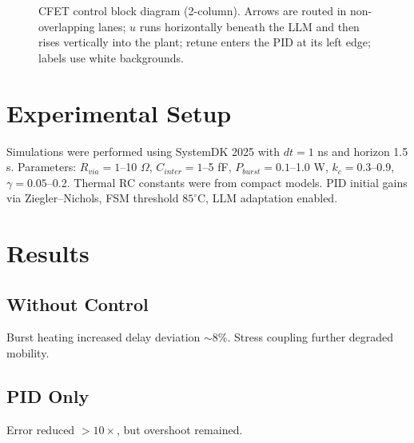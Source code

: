\documentclass[conference]{IEEEtran}
\begin{document}
\begin{figure}[!t]
{%
}
\caption{CFET control block diagram (2-column). Arrows are routed in non-overlapping lanes; $u$ runs horizontally beneath the LLM and then rises vertically into the plant; retune enters the PID at its left edge; labels use white backgrounds.}
\label{fig:model_tikz}
\end{figure}

\section{Experimental Setup}
Simulations were performed using SystemDK 2025 with $dt=1$ ns and horizon 1.5 s. Parameters:  
$R_{via}=1$--10 $\Omega$, $C_{inter}=1$--5 fF, $P_{burst}=0.1$--1.0 W, $k_c=0.3$--0.9, $\gamma=0.05$--0.2.  
Thermal RC constants were from compact models. PID initial gains via Ziegler–Nichols, FSM threshold $85^\circ$C, LLM adaptation enabled.

\section{Results}
\subsection{Without Control}
Burst heating increased delay deviation $\sim$8\%. Stress coupling further degraded mobility.  
\subsection{PID Only}
Error reduced $>10\times$, but overshoot remained.  
\end{document}
